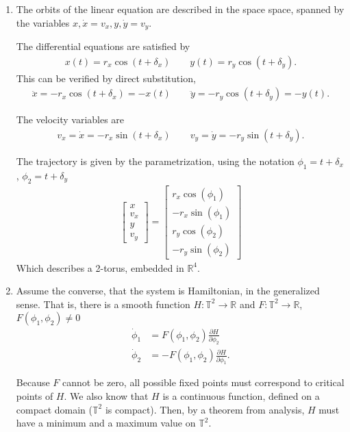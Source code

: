 \begin{solution}[8.3]
	\begin{enumerate}
\item The orbits of the linear equation are described in the space space, spanned by the variables $x, \dot{x}=v_x, y, \dot{y}=v_y$. 

The differential equations are satisfied by
\begin{align}
x(t) = r_x \cos(t + \delta_x) \qquad y(t) = r_y\cos (t+\delta_y).
\end{align}
This can be verified by direct substitution,
\begin{align}
\ddot{x} = -r_x \cos(t+\delta_x)=-x(t) \qquad \ddot{y} = -r_y \cos(t+\delta_y)=-y(t).
\end{align}

The velocity variables are 
\begin{align}
v_x=\dot{x} = -r_x\sin(t+\delta_x) \qquad v_y=\dot{y} = -r_y\sin(t+\delta_y).
\end{align}

The trajectory is given by the parametrization, using the notation $\phi_1 = t+\delta_x$, $\phi_2 = t+\delta_y$
\begin{align}
\begin{bmatrix} x \\ v_x \\ y \\ v_y \end{bmatrix} = \begin{bmatrix} r_x \cos(\phi_1) \\ -r_x \sin(\phi_1)\\ r_y\cos(\phi_2) \\ -r_y\sin(\phi_2) \end{bmatrix}
\end{align}
Which describes a 2-torus, embedded in $\mathbb{R}^4$. 

\item Assume the converse, that the system is Hamiltonian, in the generalized sense. That is, there is a smooth function $H:\mathbb{T}^2 \to \mathbb{R}$ and $F : \mathbb{T}^2 \to \mathbb{R}$, $F(\phi_1, \phi_2) \neq 0$
\begin{align}
    \dot{\phi}_1 &= F(\phi_1, \phi_2) \frac{\partial H}{\partial \phi_2}\\
    \dot{\phi}_2 &= -F(\phi_1, \phi_2)\frac{\partial H}{\partial \phi_1}.
\end{align}

Because $F$ cannot be zero, all possible fixed points must correspond to critical points of $H$. We also know that $H$ is a continuous function, defined on a compact domain ($\mathbb{T}^2$ is compact). Then, by a theorem from analysis, $H$ must have a minimum and a maximum value on $\mathbb{T}^2$. 


\end{enumerate}
\end{solution}
